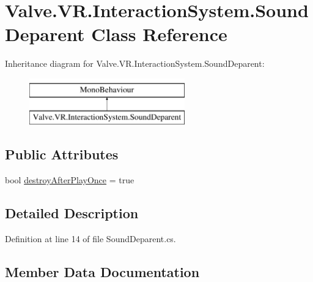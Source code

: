 \hypertarget{class_valve_1_1_v_r_1_1_interaction_system_1_1_sound_deparent}{}\section{Valve.\+V\+R.\+Interaction\+System.\+Sound\+Deparent Class Reference}
\label{class_valve_1_1_v_r_1_1_interaction_system_1_1_sound_deparent}
Inheritance diagram for Valve.\+V\+R.\+Interaction\+System.\+Sound\+Deparent\+:\begin{figure}[H]
\begin{center}
\leavevmode
\includegraphics[height=2.000000cm]{class_valve_1_1_v_r_1_1_interaction_system_1_1_sound_deparent}
\end{center}
\end{figure}
\subsection*{Public Attributes}
\begin{DoxyCompactItemize}
\item 
bool \mbox{\hyperlink{class_valve_1_1_v_r_1_1_interaction_system_1_1_sound_deparent_a0f2ff3bfe3a3660ea5ff2165f5ed67e6}{destroy\+After\+Play\+Once}} = true
\end{DoxyCompactItemize}


\subsection{Detailed Description}


Definition at line 14 of file Sound\+Deparent.\+cs.



\subsection{Member Data Documentation}
\mbox{\label{class_valve_1_1_v_r_1_1_interaction_system_1_1_sound_deparent_a0f2ff3bfe3a3660ea5ff2165f5ed67e6}} 
